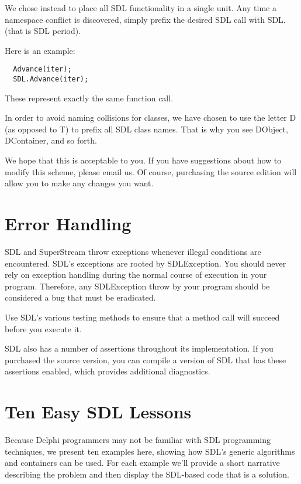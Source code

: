 \documentclass{report}
\begin{document}
We chose instead to place all SDL functionality in a single unit.  Any time
a namespace conflict is discovered, simply prefix the desired SDL call with
SDL. (that is SDL period).

Here is an example:

\begin{lstlisting}
  Advance(iter);
  SDL.Advance(iter);
\end{lstlisting}

These represent exactly the same function call.

In order to avoid naming collisions for classes, we have chosen to use the
letter D (as opposed to T) to prefix all SDL class names. That is why you
see DObject, DContainer, and so forth.

We hope that this is acceptable to you. If you have suggestions about how to
modify this scheme, please email us. Of course, purchasing the source
edition will allow you to make any changes you want.

\chapter{Error Handling}

SDL and SuperStream throw exceptions whenever illegal conditions are
encountered. SDL's exceptions are rooted by SDLException. You should never
rely on exception handling during the normal course of execution in your
program.  Therefore, any SDLException throw by your program should be
considered a bug that must be eradicated.

Use SDL's various testing methods to ensure that a method call 
will succeed before you execute it.

SDL also has a number of assertions throughout its implementation.  If you
purchased the source version, you can compile a version of SDL that has
these assertions enabled, which provides additional diagnostics.

\chapter{Ten Easy SDL Lessons}

Because Delphi programmers may not be familiar with SDL programming
techniques, we present ten examples here, showing how SDL's generic
algorithms and containers can be used. For each example we'll provide a
short narrative describing the problem and then display the SDL-based code
that is a solution.
\end{document}
